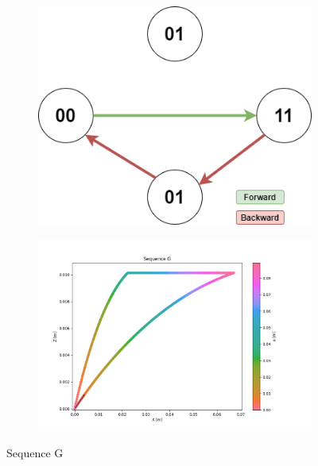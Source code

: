         \begin{figure}[h]
            \begin{subfigure}{.3\textwidth}
            \includegraphics[width=\textwidth]{images/Sequences-Sequence G.png}
            \end{subfigure}%
            \begin{subfigure}{.7\textwidth}
            \includegraphics[width=\textwidth]{images/G.png}
            \end{subfigure}
            \caption{Sequence G}
        \end{figure}
